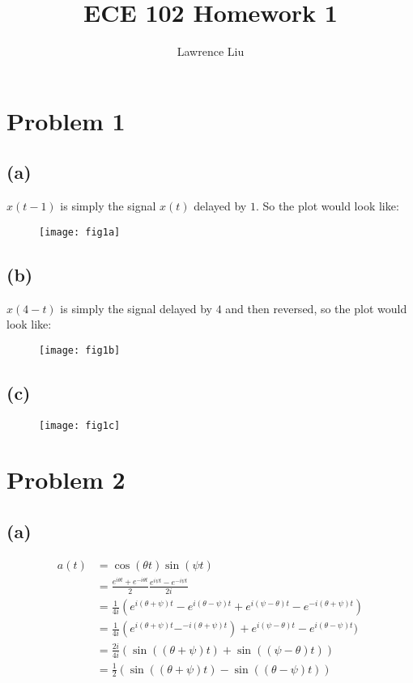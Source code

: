 \documentclass[12pt]{article}
\title{ECE 102 Homework 1}
\author{Lawrence Liu}
\begin{document}
\maketitle
\section*{Problem 1}
\subsection*{(a)}
$x(t-1)$ is simply the signal $x(t)$ delayed by $1$. So the plot would look like:
\begin{figure}[h]
\texttt{[image: fig1a]}
\centering
\end{figure}
\subsection*{(b)}
$x(4-t)$ is simply the signal delayed by $4$ and then reversed, so the plot would look like:
\begin{figure}[h]
\texttt{[image: fig1b]}
\centering
\end{figure}
\subsection*{(c)}
\begin{figure}[h]
\texttt{[image: fig1c]}
\centering
\end{figure}
\section*{Problem 2}
\subsection*{(a)}
\begin{align*}
a(t) &=\cos(\theta t)\sin(\psi t)\\
&=\frac{e^{i\theta t}+e^{-i\theta t}}{2}\frac{e^{i\psi t}-e^{-i\psi t}}{2i}\\
&=\frac{1}{4i}(e^{i(\theta+\psi) t}-e^{i(\theta-\psi)t}+e^{i(\psi-\theta)t}-e^{-i(\theta+\psi)t})\\
&=\frac{1}{4i}(e^{i(\theta+\psi) t}-^{-i(\theta+\psi)t})+e^{i(\psi-\theta)t}-e^{i(\theta-\psi)t})\\
&=\frac{2i}{4i}(\sin((\theta+\psi)t)+\sin((\psi-\theta)t))\\
&=\frac{1}{2}(\sin((\theta+\psi)t)-\sin((\theta-\psi)t))
\end{align*}
\end{document}
